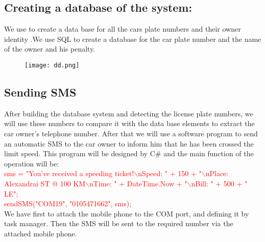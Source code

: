 \subsection{Creating a database of the system:}
We use to create a data base for all the cars plate numbers and their
owner identity .We use SQL to create a database for the car plate
number and the name of the owner and his penalty.
\begin{figure}[!h]
	\centering
	\texttt{[image: dd.png]}
\end{figure}
\subsection{Sending SMS}
\noindent After building the database system and detecting the license plate
numbers, we will use these numbers to compare it with the data
base elements to extract the car owner's telephone number. After
that we will use a software program to send an automatic SMS to
the car owner to inform him that he has been crossed the limit
speed. This program will be designed by C\# and the main function
of the operation will be:\\
\textcolor{red}{sms = "You've received a speeding ticket!$\backslash$nSpeed: " + 150 +
	"$\backslash$nPlace: Alexandrai ST @ 100 KM$\backslash$nTime: " + DateTime.Now + "$\backslash$nBill: "
	+ 500 + " LE";\\
	sendSMS("COM19", "0105471662", sms);} \\
We have first to attach the mobile phone to the COM port, and
defining it by task manager. Then the SMS will be sent to the
required number via the attached mobile phone.
